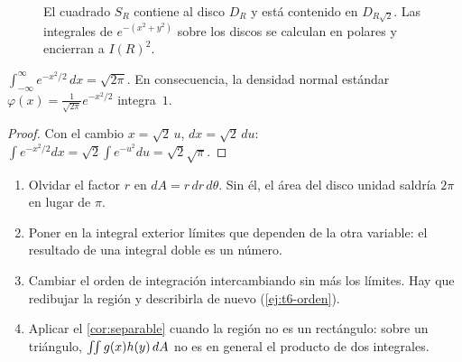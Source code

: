 \begin{figure}[ht]
\centering
{}
\caption{El cuadrado $S_R$ contiene al disco $D_R$ y está contenido en $D_{R\sqrt2}$. Las integrales de $e^{-(x^2+y^2)}$ sobre los discos se calculan en polares y encierran a $I(R)^2$.}
\label{fig:t6-gauss}
\end{figure}

\begin{corolario}\label{cor:gauss-normal}
$\displaystyle\int_{-\infty}^{\infty}e^{-x^2/2}\,dx=\sqrt{2\pi}$. En consecuencia, la densidad normal estándar $\varphi(x)=\frac{1}{\sqrt{2\pi}}e^{-x^2/2}$ integra~$1$.
\end{corolario}

\begin{proof}
Con el cambio $x=\sqrt2\,u$, $dx=\sqrt2\,du$: $\int e^{-x^2/2}dx=\sqrt2\int e^{-u^2}du=\sqrt2\sqrt\pi$.
\end{proof}

\begin{observacion}
\begin{enumerate}[label=(\alph*)]
\item Olvidar el factor $r$ en $dA=r\,dr\,d\theta$. Sin él, el área del disco unidad saldría $2\pi$ en lugar de $\pi$.
\item Poner en la integral exterior límites que dependen de la otra variable: el resultado de una integral doble es un número.
\item Cambiar el orden de integración intercambiando sin más los límites. Hay que redibujar la región y describirla de nuevo (\cref{ej:t6-orden}).
\item Aplicar el \cref{cor:separable} cuando la región no es un rectángulo: sobre un triángulo, $\iint g(x)h(y)\,dA$ no es en general el producto de dos integrales.
\end{enumerate}
\end{observacion}

